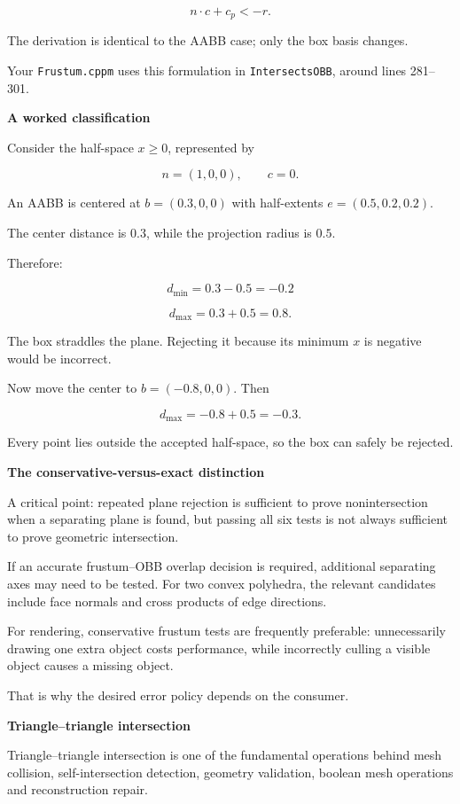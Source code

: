 \[
n\cdot c+c_p<-r.
\]

The derivation is identical to the AABB case; only the box basis changes.

Your \texttt{Frustum.cppm} uses this formulation in \texttt{IntersectsOBB}, around lines 281--301.

\textbf{A worked classification}

Consider the half-space \(x\ge0\), represented by

\[
n=(1,0,0),\qquad c=0.
\]

An AABB is centered at \(b=(0.3,0,0)\) with half-extents \(e=(0.5,0.2,0.2)\).

The center distance is \(0.3\), while the projection radius is \(0.5\).

Therefore:

\[
d_{\min}=0.3-0.5=-0.2
\]

\[
d_{\max}=0.3+0.5=0.8.
\]

The box straddles the plane. Rejecting it because its minimum \(x\) is negative would be incorrect.

Now move the center to \(b=(-0.8,0,0)\). Then

\[
d_{\max}=-0.8+0.5=-0.3.
\]

Every point lies outside the accepted half-space, so the box can safely be rejected.

\textbf{The conservative-versus-exact distinction}

A critical point: repeated plane rejection is sufficient to prove nonintersection when a separating plane is found, but passing all six tests is not always sufficient to prove geometric intersection.

If an accurate frustum--OBB overlap decision is required, additional separating axes may need to be tested. For two convex polyhedra, the relevant candidates include face normals and cross products of edge directions.

For rendering, conservative frustum tests are frequently preferable: unnecessarily drawing one extra object costs performance, while incorrectly culling a visible object causes a missing object.

That is why the desired error policy depends on the consumer.

\textbf{Triangle--triangle intersection}

Triangle--triangle intersection is one of the fundamental operations behind mesh collision, self-intersection detection, geometry validation, boolean mesh operations and reconstruction repair.

